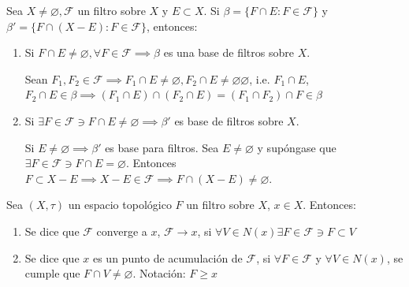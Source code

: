  \begin{teorema}
    Sea $X\neq \varnothing, \mathcal{F}$ un filtro sobre $X$ y $E\subset X$. Si $\beta=\{F\cap E: F\in \mathcal{F}\}$ y $\beta' =\{F\cap (X-E):F\in \mathcal{F}\}$, entonces: 
    \begin{enumerate}
        \item Si $F\cap E\neq \varnothing,\forall F\in \mathcal{F}\implies \beta$ es una base de filtros sobre $X$. 
        \begin{dem}
            Sean $F_1,F_2\in \mathcal{F}\implies F_1\cap E\neq \varnothing, F_2\cap E\neq \varnothing \varnothing$, i.e. $F_1\cap E$, $F_2\cap E\in \beta\implies (F_1\cap E)\cap (F_2\cap E)=(F_1\cap F_2)\cap F\in \beta$
        \end{dem}
        \item Si $\exists F\in \mathcal{F}\ni F\cap E\neq \varnothing \implies \beta '$ es base de filtros sobre $X$. 
        \begin{dem}
            Si $E\neq \varnothing\implies \beta'$ es base para filtros. Sea $E\neq \varnothing $ y supóngase que $\exists F\in \mathcal{F}\ni F\cap E=\varnothing$. Entonces $F\subset X-E\implies X-E\in \mathcal{F}\implies F\cap(X-E)\neq \varnothing$. 
        \end{dem}
    \end{enumerate}
 \end{teorema}

 \begin{definicion}
    Sea $(X,\tau)$ un espacio topológico $F$ un filtro sobre $X$, $x\in X$. Entonces: 
    \begin{enumerate}
        \item Se dice que $\mathcal{F}$ converge a $x$, $\mathcal{F}\to x$, si $\forall V\in N(x)\exists F\in \mathcal{F}\ni F\subset V$
        \item Se dice que $x$ es un punto de acumulación de $\mathcal{F}$, si $\forall F\in \mathcal{F}$ y $\forall V \in N(x)$, se cumple que $F\cap V\neq \varnothing$. Notación: $F\geq x$
    \end{enumerate}
 \end{definicion}


